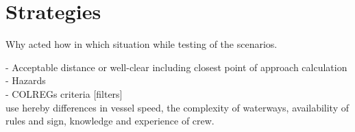 \chapter{Strategies}

Why acted how in which situation while testing of the scenarios.

- Acceptable distance or well-clear including closest point of approach calculation\\
- Hazards\\
- COLREGs criteria [filters]\\

use hereby differences in vessel speed, the complexity of waterways, availability of rules and sign, knowledge and experience of crew.